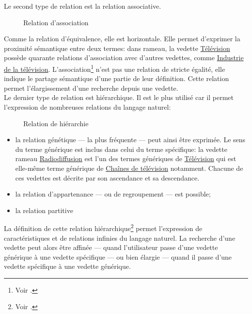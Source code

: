 Le second type de relation est la relation associative. \begin{wrapfigure}{R}{5cm}
	\centering
	
	\caption{Relation d'association}
	\label{relation_association}	
\end{wrapfigure} Comme la relation d'équivalence, elle est horizontale. Elle permet d'exprimer la proximité sémantique entre deux termes: dans \ac{rameau}, la vedette \href{https://data.bnf.fr/fr/11933646/television/}{\og Télévision\fg{}} possède quarante relations d'association avec d'autres vedettes, comme \href{https://data.bnf.fr/fr/12648926/industrie_de_la_television/}{\og Industrie de la télévision\fg{}}. L'association\footnote{Voir .} n'est pas une relation de stricte égalité, elle indique le partage sémantique d'une partie de leur définition. Cette relation permet l'élargissement d'une recherche depuis une vedette.\\

Le dernier type de relation est hiérarchique. Il est le plus utilisé car il permet l'expression de nombreuses relations du langage naturel: \begin{wrapfigure}{L}{5cm}
	\centering
	
	\caption{Relation de hiérarchie}
	\label{relation_hierar}	
\end{wrapfigure}
\begin{itemize}
	\item la relation génétique --- la plus fréquente --- peut ainsi être exprimée. Le sens du terme générique est inclus dans celui du terme spécifique: la vedette \ac{rameau} \href{https://data.bnf.fr/fr/11960499/radiodiffusion/}{\og Radiodiffusion\fg{}} est l'un des termes génériques de  \href{https://data.bnf.fr/fr/11933646/television/}{\og Télévision\fg{}} qui est elle-même terme générique de \href{https://data.bnf.fr/fr/11936935/chaines_de_television/}{\og Chaînes de télévision\fg{}} notamment. Chacune de ces vedettes est décrite par son ascendance et sa descendance.
	\item la relation d'appartenance --- ou de regroupement --- est possible;
	\item la relation partitive
\end{itemize}
La définition de cette relation hiérarchique\footnote{Voir .} permet l'expression de caractéristiques et de relations infinies du langage naturel. La recherche d'une vedette peut alors être affinée --- quand l'utilisateur passe d'une vedette générique à une vedette spécifique --- ou bien élargie --- quand il passe d'une vedette spécifique à une vedette générique.\\

